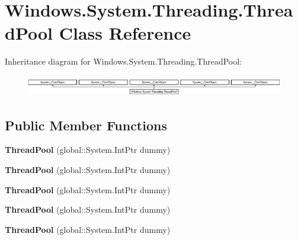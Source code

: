 \hypertarget{class_windows_1_1_system_1_1_threading_1_1_thread_pool}{}\section{Windows.\+System.\+Threading.\+Thread\+Pool Class Reference}
\label{class_windows_1_1_system_1_1_threading_1_1_thread_pool}
Inheritance diagram for Windows.\+System.\+Threading.\+Thread\+Pool\+:\begin{figure}[H]
\begin{center}
\leavevmode
\includegraphics[height=0.918033cm]{class_windows_1_1_system_1_1_threading_1_1_thread_pool}
\end{center}
\end{figure}
\subsection*{Public Member Functions}
\begin{DoxyCompactItemize}
\item 
\mbox{\label{class_windows_1_1_system_1_1_threading_1_1_thread_pool_a33cbd7b3f58e6af6866e7abbd9ef7577}} 
{\bfseries Thread\+Pool} (global\+::\+System.\+Int\+Ptr dummy)
\item 
\mbox{\label{class_windows_1_1_system_1_1_threading_1_1_thread_pool_a33cbd7b3f58e6af6866e7abbd9ef7577}} 
{\bfseries Thread\+Pool} (global\+::\+System.\+Int\+Ptr dummy)
\item 
\mbox{\label{class_windows_1_1_system_1_1_threading_1_1_thread_pool_a33cbd7b3f58e6af6866e7abbd9ef7577}} 
{\bfseries Thread\+Pool} (global\+::\+System.\+Int\+Ptr dummy)
\item 
\mbox{\label{class_windows_1_1_system_1_1_threading_1_1_thread_pool_a33cbd7b3f58e6af6866e7abbd9ef7577}} 
{\bfseries Thread\+Pool} (global\+::\+System.\+Int\+Ptr dummy)
\item 
\mbox{\label{class_windows_1_1_system_1_1_threading_1_1_thread_pool_a33cbd7b3f58e6af6866e7abbd9ef7577}} 
{\bfseries Thread\+Pool} (global\+::\+System.\+Int\+Ptr dummy)
\end{DoxyCompactItemize}
